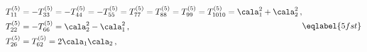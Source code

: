 \begin{equation} 
\begin{split}
&T^{(5)}_{11}=-T^{(5)}_{33}=-T^{(5)}_{44}=-T^{(5)}_{55}=T^{(5)}_{77}
=T^{(5)}_{88}=T^{(5)}_{99}=T^{(5)}_{1010}=\cala_1^2+\cala_2^2\,,\\
&T^{(5)}_{22}=-T^{(5)}_{66}=\cala_2^2-\cala_1^2\,,\\
&T^{(5)}_{26}= T^{(5)}_{62}=2\cala_1 \cala_2\,,  
\end{split}
\eqlabel{5fst}
\end{equation}

